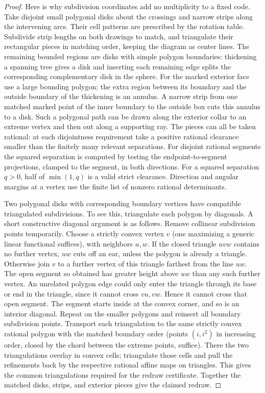 \begin{proof}
Here is why subdivision coordinates add no multiplicity to a fixed code.
Take disjoint small polygonal disks about the crossings and narrow strips
along the intervening arcs. Their cell patterns are prescribed by the
rotation table. Subdivide strip lengths on both drawings to match, and
triangulate their rectangular pieces in matching order, keeping the
diagram as center lines. The remaining bounded regions are disks with
simple polygon boundaries: thickening a spanning tree gives a disk and
inserting each remaining edge splits the corresponding complementary
disk in the sphere. For the marked exterior face use a large bounding
polygon; the extra region between its boundary and the outside boundary
of the thickening is an annulus. A narrow strip from one matched marked
point of the inner boundary to the outside box cuts this annulus to a
disk. Such a polygonal path can be drawn along the exterior collar to an
extreme vertex and then out along a supporting ray. The pieces can all
be taken rational: at each disjointness requirement take a positive
rational clearance smaller than the finitely many relevant separations.
For disjoint rational segments the squared separation is computed by
testing the endpoint-to-segment projections, clamped to the segment,
in both directions. For a squared separation $q>0$, half of
$\min(1,q)$ is a valid strict clearance. Direction and angular margins
at a vertex use the finite list of nonzero rational determinants.

Two polygonal disks with corresponding boundary vertices have compatible
triangulated subdivisions. To see this, triangulate each polygon by
diagonals. A short constructive diagonal argument is as follows. Remove
collinear subdivision points temporarily. Choose a strictly convex
vertex $v$ (one maximizing a generic linear functional suffices), with
neighbors $u,w$. If the closed triangle $uvw$ contains no further
vertex, $uw$ cuts off an ear, unless the polygon is already a triangle.
Otherwise join $v$ to a further vertex of this triangle farthest from
the line $uw$. The open segment so obtained has greater height above
$uw$ than any such further vertex. An unrelated polygon edge could only
enter the triangle through its base or end in the triangle, since it
cannot cross $vu,vw$. Hence it cannot cross that open segment.
The segment starts inside at the convex corner, and so is an interior
diagonal. Repeat on the smaller polygons and reinsert all boundary
subdivision points. Transport each triangulation to the same strictly
convex rational polygon with the matched boundary order (points
$(i,i^2)$ in increasing order, closed by the chord between the extreme
points, suffice). There the two triangulations overlay in convex cells;
triangulate those cells and pull the refinements back by the respective
rational affine maps on triangles. This gives the common triangulations
required for the redraw certificate. Together the matched disks, strips,
and exterior pieces give the claimed redraw.


\end{proof}
